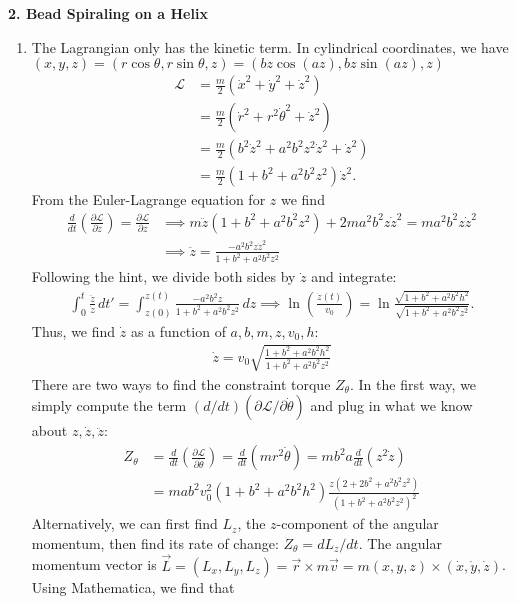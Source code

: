 \documentclass{article}
\theoremstyle{definition}
\newcommand{\p}{\partial}
\newcommand{\lag}{\mathcal{L}}
\newcommand{\f}[2]{\frac{#1}{#2}}
\newcommand{\lp}{\left(}
\newcommand{\rp}{\right)}
\begin{document}
	
\noindent \textbf{2. Bead Spiraling on a Helix}
\begin{enumerate}[label = (\alph*)]
	\item The Lagrangian only has the kinetic term. In cylindrical coordinates, we have  $(x,y,z) = (r\cos\theta,r\sin\theta,z) = (bz\cos(az), bz \sin(az), z )$
	\begin{align*}
	\lag &= \f{m}{2}(\dot{x}^2 + \dot{y}^2 + \dot{z}^2)\\
	&= \f{m}{2}( \dot{r}^2 + r^2\dot{\theta}^2 +  \dot{z}^2)\\
	&= \f{m}{2}(b^2 \dot{z}^2 + a^2b^2 z^2 \dot{z}^2 + \dot{z}^2)\\
	&= \f{m}{2}(1+b^2+a^2b^2 z^2)\dot{z}^2.
	\end{align*}
	From the Euler-Lagrange equation for $z$ we find 
	\begin{align*}
	\f{d}{dt}\lp \f{\p \lag}{\p \dot{z}} \rp = \f{\p \lag}{\p z} 
	&\implies  m\ddot{z}(1+b^2 + a^2b^2 z^2) + 2ma^2b^2 z\dot{z}^2 = ma^2b^2z\dot{z}^2\\
	&\implies {\ddot{z} = \f{-a^2b^2 z\dot{z}^2}{1+b^2+a^2b^2 z^2}}
	\end{align*}
	Following the hint, we divide both sides by $\dot{z}$ and integrate:
	\begin{align*}
	\int_{0}^t \f{\ddot{z}}{\dot{z}}\,dt' = \int_{z(0)}^{z(t)}	\f{-a^2b^2 z}{1+b^2+a^2b^2 z^2}\,dz
	\implies  \ln \lp \f{\dot{z}(t)}{v_0} \rp = \ln \f{\sqrt{1+b^2+a^2b^2 h^2}}{\sqrt{1+b^2+a^2b^2 z^2}}.
	\end{align*}
	Thus, we find $\dot{z}$ as a function of $a,b,m,z,v_0,h$:
	\begin{align*}
	\boxed{\dot{z} = v_0 \sqrt{\f{1+b^2+a^2b^2h^2}{1+b^2+a^2b^2z^2}}}
	\end{align*}
	There are two ways to find the constraint torque $Z_\theta$. In the first way, we simply compute the term $(d/dt)(\p \lag/\p \dot{\theta})$ and plug in what we know about $z,\dot{z},\ddot{z}$:
	\begin{align*}
	Z_\theta &= \f{d}{dt} \lp \f{\p \lag}{\p \dot{\theta}} \rp =  \f{d}{dt}\lp mr^2\dot\theta \rp  = mb^2 a \f{d}{dt}\lp z^2\dot{z} \rp \\
	&= \boxed{mab^2 v_0^2 (1+b^2+a^2b^2h^2) \f{z(2+2b^2 +a^2b^2 z^2)}{(1+b^2 + a^2b^2 z^2)^2}}
	\end{align*}
	Alternatively, we can first find $L_z$, the $z$-component of the angular momentum, then find its rate of change: $Z_\theta = dL_z/dt$. The angular momentum vector is $\vec{L} = (L_x,L_y,L_z) = \vec{r}\times m\vec{v} = m(x,y,z)\times (\dot x,\dot y, \dot z)$. Using Mathematica, we find that 

\end{enumerate}
\end{document}
